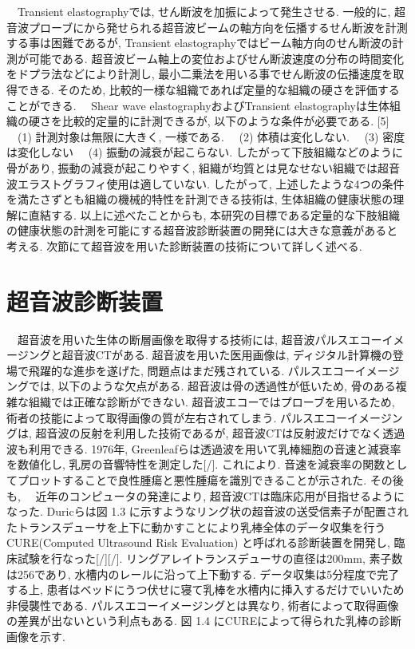 　Transient elastographyでは, せん断波を加振によって発生させる. 一般的に, 超音波プローブにから発せられる超音波ビームの軸方向を伝播するせん断波を計測する事は困難であるが, Transient elastographyではビーム軸方向のせん断波の計測が可能である. 超音波ビーム軸上の変位およびせん断波速度の分布の時間変化をドプラ法などにより計測し, 最小二乗法を用いる事でせん断波の伝播速度を取得できる. そのため, 比較的一様な組織であれば定量的な組織の硬さを評価することができる. 
　Shear wave elastographyおよびTransient elastographyは生体組織の硬さを比較的定量的に計測できるが, 以下のような条件が必要である. [5]
　(1) 計測対象は無限に大きく, 一様である.
　(2) 体積は変化しない. 
　(3) 密度は変化しない
　(4) 振動の減衰が起こらない. 
したがって下肢組織などのように骨があり, 振動の減衰が起こりやすく, 組織が均質とは見なせない組織では超音波エラストグラフィ使用は適していない. したがって, 上述したような4つの条件を満たさずとも組織の機械的特性を計測できる技術は, 生体組織の健康状態の理解に直結する. 以上に述べたことからも, 本研究の目標である定量的な下肢組織の健康状態の計測を可能にする超音波診断装置の開発には大きな意義があると考える. 次節にて超音波を用いた診断装置の技術について詳しく述べる. 

\section{超音波診断装置}
　超音波を用いた生体の断層画像を取得する技術には, 超音波パルスエコーイメージングと超音波CTがある. 超音波を用いた医用画像は, ディジタル計算機の登場で飛躍的な進歩を遂げた, 問題点はまだ残されている. パルスエコーイメージングでは, 以下のような欠点がある. 
超音波は骨の透過性が低いため, 骨のある複雑な組織では正確な診断ができない.
超音波エコーではプローブを用いるため, 術者の技能によって取得画像の質が左右されてしまう.
パルスエコーイメージングは, 超音波の反射を利用した技術であるが, 超音波CTは反射波だけでなく透過波も利用できる. 1976年, Greenleafらは透過波を用いて乳棒細胞の音速と減衰率を数値化し, 乳房の音響特性を測定した[/]. これにより. 音速を減衰率の関数としてプロットすることで良性腫瘍と悪性腫瘍を識別できることが示された. その後も, 
　近年のコンピュータの発達により, 超音波CTは臨床応用が目指せるようになった. Duricらは図 1.3 に示すようなリング状の超音波の送受信素子が配置されたトランスデューサを上下に動かすことにより乳棒全体のデータ収集を行うCURE(Computed Ultrasound Risk Evaluation) と呼ばれる診断装置を開発し, 臨床試験を行なった[/][/]. リングアレイトランスデューサの直径は200mm, 素子数は256であり, 水槽内のレールに沿って上下動する. データ収集は5分程度で完了する上, 患者はベッドにうつ伏せに寝て乳棒を水槽内に挿入するだけでいいため非侵襲性である. パルスエコーイメージングとは異なり, 術者によって取得画像の差異が出ないという利点もある. 図 1.4 にCUREによって得られた乳棒の診断画像を示す.

